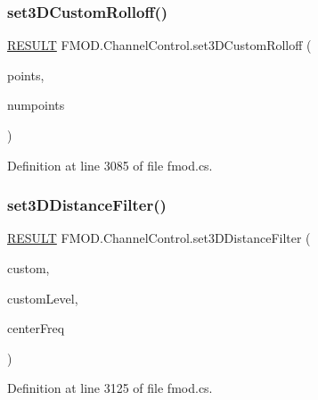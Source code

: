 \mbox{\label{class_f_m_o_d_1_1_channel_control_a53e43de080eb44dc47c931f953ff3434}} 
\subsubsection{\texorpdfstring{set3\+D\+Custom\+Rolloff()}{set3DCustomRolloff()}}
{\footnotesize\ttfamily \hyperlink{namespace_f_m_o_d_a305d1176ef3f8c8815861a60407ac33d}{R\+E\+S\+U\+LT} F\+M\+O\+D.\+Channel\+Control.\+set3\+D\+Custom\+Rolloff (\begin{DoxyParamCaption}\item[{ref \hyperlink{struct_f_m_o_d_1_1_v_e_c_t_o_r}{V\+E\+C\+T\+OR}}]{points,  }\item[{int}]{numpoints }\end{DoxyParamCaption})}



Definition at line 3085 of file fmod.\+cs.

\mbox{\label{class_f_m_o_d_1_1_channel_control_a7ac40722cfe596b35b20250550bf045a}} 
\subsubsection{\texorpdfstring{set3\+D\+Distance\+Filter()}{set3DDistanceFilter()}}
{\footnotesize\ttfamily \hyperlink{namespace_f_m_o_d_a305d1176ef3f8c8815861a60407ac33d}{R\+E\+S\+U\+LT} F\+M\+O\+D.\+Channel\+Control.\+set3\+D\+Distance\+Filter (\begin{DoxyParamCaption}\item[{bool}]{custom,  }\item[{float}]{custom\+Level,  }\item[{float}]{center\+Freq }\end{DoxyParamCaption})}



Definition at line 3125 of file fmod.\+cs.

